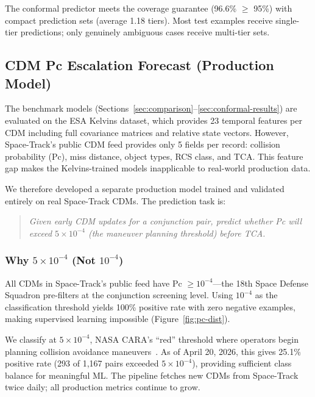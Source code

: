 \documentclass{article}
\begin{document}
The conformal predictor meets the coverage guarantee (96.6\% $\geq$ 95\%) with compact prediction sets (average 1.18 tiers). Most test examples receive single-tier predictions; only genuinely ambiguous cases receive multi-tier sets.

\subsection{CDM Pc Escalation Forecast (Production Model)}
\label{sec:cdm-forecast}

The benchmark models (Sections~\ref{sec:comparison}--\ref{sec:conformal-results}) are evaluated on the ESA Kelvins dataset, which provides 23 temporal features per CDM including full covariance matrices and relative state vectors. However, Space-Track's public CDM feed provides only 5 fields per record: collision probability (Pc), miss distance, object types, RCS class, and TCA. This feature gap makes the Kelvins-trained models inapplicable to real-world production data.

We therefore developed a separate production model trained and validated entirely on real Space-Track CDMs. The prediction task is:

\begin{quote}
\emph{Given early CDM updates for a conjunction pair, predict whether Pc will exceed $5 \times 10^{-4}$ (the maneuver planning threshold) before TCA.}
\end{quote}

\subsubsection{Why $5 \times 10^{-4}$ (Not $10^{-4}$)}
\label{sec:threshold}

All CDMs in Space-Track's public feed have Pc $\geq 10^{-4}$---the 18th Space Defense Squadron pre-filters at the conjunction screening level. Using $10^{-4}$ as the classification threshold yields 100\% positive rate with zero negative examples, making supervised learning impossible (Figure~\ref{fig:pc-dist}).

We classify at $5 \times 10^{-4}$, NASA CARA's ``red'' threshold where operators begin planning collision avoidance maneuvers~\citep{hejduk2023}. As of April 20, 2026, this gives 25.1\% positive rate (293 of 1,167 pairs exceeded $5 \times 10^{-4}$), providing sufficient class balance for meaningful ML. The pipeline fetches new CDMs from Space-Track twice daily; all production metrics continue to grow.
\end{document}
